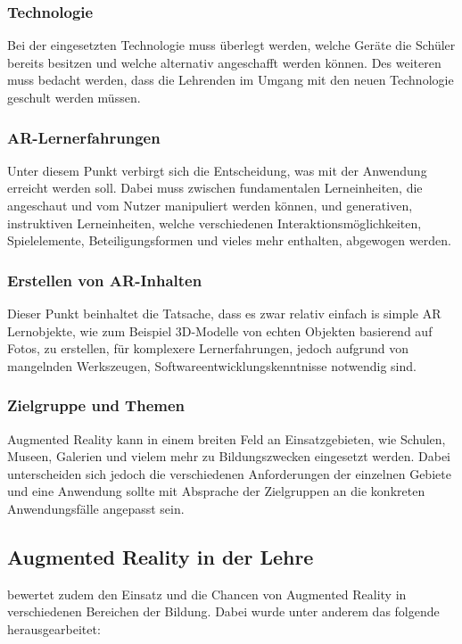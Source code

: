 \subsubsection{Technologie}
Bei der eingesetzten Technologie muss überlegt werden, welche Geräte die Schüler bereits besitzen und welche alternativ angeschafft werden können. Des weiteren muss bedacht werden, dass die Lehrenden im Umgang mit den neuen Technologie geschult werden müssen.
\subsubsection{AR-Lernerfahrungen}
Unter diesem Punkt verbirgt sich die Entscheidung, was mit der Anwendung erreicht werden soll. Dabei muss zwischen fundamentalen Lerneinheiten, die angeschaut und vom Nutzer manipuliert werden können, und generativen, instruktiven Lerneinheiten, welche verschiedenen Interaktionsmöglichkeiten, Spielelemente, Beteiligungsformen und vieles mehr enthalten,  abgewogen werden. 
\subsubsection{Erstellen von AR-Inhalten}
Dieser Punkt beinhaltet die Tatsache, dass es zwar relativ einfach is simple AR Lernobjekte, wie zum Beispiel 3D-Modelle von echten Objekten basierend auf Fotos, zu erstellen, für komplexere Lernerfahrungen, jedoch aufgrund von mangelnden Werkszeugen, Softwareentwicklungskenntnisse notwendig sind.
\subsubsection{Zielgruppe und Themen}
Augmented Reality kann in einem breiten Feld an Einsatzgebieten, wie Schulen, Museen, Galerien und vielem mehr zu Bildungszwecken eingesetzt werden. Dabei unterscheiden sich jedoch die verschiedenen Anforderungen der einzelnen Gebiete und eine Anwendung sollte mit Absprache der Zielgruppen an die konkreten Anwendungsfälle angepasst sein.

\subsection{Augmented Reality in der Lehre}
\citeauthor{geroimenko:ar-in-education} bewertet zudem den Einsatz und die Chancen von Augmented Reality in verschiedenen Bereichen der Bildung. Dabei wurde unter anderem das folgende herausgearbeitet: 

